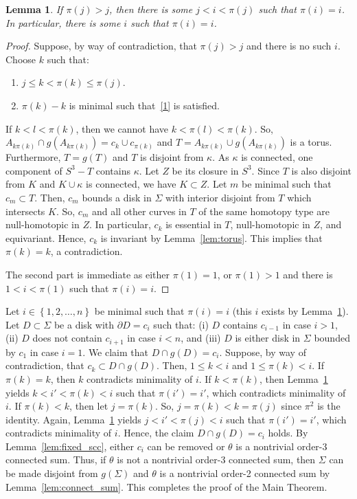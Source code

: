 \documentclass{amsart}
\numberwithin{equation}{section}
\newtheorem{lemma}[theorem]{Lemma}
\theoremstyle{definition}
\newcommand{\cpa}[1]{\left\{#1\right\}}
\begin{document}
\begin{lemma}\label{lem:there_is_fixed_scc}
If $\pi(j)>j$, then there is some $j<i<\pi(j)$ such that $\pi(i)=i$.
In particular, there is some $i$ such that $\pi(i)=i$.
\end{lemma}
\begin{proof}
Suppose, by way of contradiction, that $\pi(j)>j$ and there is no such $i$.
Choose $k$ such that:
\begin{enumerate}
\item\label{1} $j\leq k<\pi(k)\leq\pi(j)$.
\item $\pi(k)-k$ is minimal such that~\ref{1} is satisfied.
\end{enumerate}
If $k<l<\pi(k)$, then we cannot have $k<\pi(l)<\pi(k)$.
So, $A_{k\pi(k)}\cap g(A_{k\pi(k)})=c_k\cup c_{\pi(k)}$ and $T=A_{k\pi(k)}\cup g(A_{k\pi(k)})$ is a torus.
Furthermore, $T=g(T)$ and $T$ is disjoint from $\kappa$.
As $\kappa$ is connected, one component of $S^3-T$ contains $\kappa$.
Let $Z$ be its closure in $S^3$.
Since $T$ is also disjoint from $K$ and $K\cup\kappa$ is connected, we have $K\subset Z$.
Let $m$ be minimal such that $c_m\subset T$.
Then, $c_m$ bounds a disk in $\Sigma$ with interior disjoint from $T$ which intersects $K$.
So, $c_m$ and all other curves in $T$ of the same homotopy type are null-homotopic in $Z$.
In particular, $c_k$ is essential in $T$, null-homotopic in $Z$, and equivariant.
Hence, $c_k$ is invariant by Lemma~\ref{lem:torus}. This implies that $\pi(k)=k$, a contradiction.

The second part is immediate as either $\pi(1)=1$, or $\pi(1)>1$ and there is $1<i<\pi(1)$ such that $\pi(i)=i$.
\end{proof}

Let $i\in\cpa{1,2,\ldots,n}$ be minimal such that $\pi(i)=i$ (this $i$ exists by Lemma~\ref{lem:there_is_fixed_scc}).
Let $D\subset\Sigma$ be a disk with $\partial D=c_i$ such that: (i) $D$ contains $c_{i-1}$ in case $i>1$, (ii) $D$ does not contain $c_{i+1}$ in case $i<n$, and (iii) $D$ is either disk in $\Sigma$ bounded by $c_1$ in case $i=1$.
We claim that $D\cap g(D)=c_i$. Suppose, by way of contradiction, that $c_k\subset D\cap g(D)$.
Then, $1\leq k <i$ and $1\leq \pi(k)<i$. If $\pi(k)=k$, then $k$ contradicts minimality of $i$.
If $k<\pi(k)$, then Lemma~\ref{lem:there_is_fixed_scc} yields $k<i'<\pi(k)<i$ such that $\pi(i')=i'$, which contradicts minimality of $i$.
If $\pi(k)<k$, then let $j=\pi(k)$. So, $j=\pi(k)<k=\pi(j)$ since $\pi^2$ is the identity.
Again, Lemma~\ref{lem:there_is_fixed_scc} yields $j<i'<\pi(j)<i$ such that $\pi(i')=i'$, which contradicts minimality of $i$.
Hence, the claim $D\cap g(D)=c_i$ holds.
By Lemma~\ref{lem:fixed_scc}, either $c_i$ can be removed or $\theta$ is a nontrivial order-3 connected sum. Thus, if $\theta$ is not a nontrivial order-3 connected sum, then $\Sigma$ can be made disjoint from $g(\Sigma)$ and $\theta$ is a nontrivial order-2 connected sum by Lemma~\ref{lem:connect_sum}.
This completes the proof of the Main Theorem.
\end{document}
